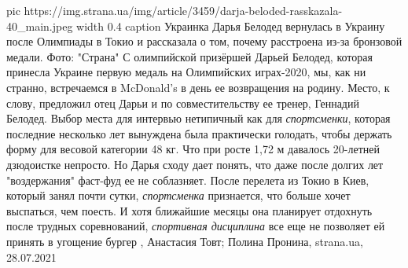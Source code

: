 \ifcmt
  pic https://img.strana.ua/img/article/3459/darja-beloded-rasskazala-40_main.jpeg
  width 0.4
	caption Украинка Дарья Белодед вернулась в Украину после Олимпиады в Токио и рассказала о том, почему расстроена из-за бронзовой медали. Фото: "Страна"
\fi
С олимпийской призёршей Дарьей Белодед, которая принесла Украине первую медаль
на Олимпийских играх-2020, мы, как ни странно, встречаемся в McDonald's в день
ее возвращения на родину. Место, к слову, предложил отец Дарьи и по
совместительству ее тренер, Геннадий Белодед.  Выбор места для интервью
нетипичный как для \emph{спортсменки}, которая последние несколько лет вынуждена была
практически голодать, чтобы держать форму для весовой категории 48 кг. Что при
росте 1,72 м давалось 20-летней дзюдоистке непросто.  Но Дарья сходу дает
понять, что даже после долгих лет "воздержания" фаст-фуд ее не соблазняет.
После перелета из Токио в Киев, который занял почти сутки, \emph{спортсменка}
признается, что больше хочет выспаться, чем поесть. И хотя ближайшие месяцы она
планирует отдохнуть после трудных соревнований, \emph{спортивная дисциплина} все еще
не позволяет ей принять в угощение бургер
, 
Анастасия Товт; Полина Пронина, strana.ua, 28.07.2021
